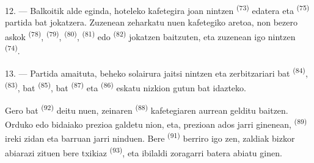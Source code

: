 12. --- Balkoitik alde eginda, hoteleko kafetegira joan nintzen 
\textsuperscript{(73)} edatera eta  \textsuperscript{(75)} partida
bat jokatzera. Zuzenean zeharkatu nuen kafetegiko aretoa, non bezero askok
 \textsuperscript{(78)}, 
\textsuperscript{(79)},  \textsuperscript{(80)},
 \textsuperscript{(81)} edo 
\textsuperscript{(82)} jokatzen baitzuten, eta zuzenean igo nintzen
 \textsuperscript{(74)}.

13. --- Partida amaituta, beheko solairura jaitsi nintzen eta zerbitzariari
 bat \textsuperscript{(84)}, 
\textsuperscript{(83)},  bat \textsuperscript{(85)},
 bat \textsuperscript{(87)} eta 
\textsuperscript{(86)} eskatu nizkion gutun bat idazteko.

Gero  bat \textsuperscript{(92)} deitu nuen, zeinaren
 \textsuperscript{(88)} kafetegiaren aurrean gelditu baitzen.
Orduko edo bidaiako prezioa galdetu nion, eta, prezioan ados jarri ginenean,
 \textsuperscript{(89)} ireki zidan eta barruan jarri ninduen.
Bere  \textsuperscript{(91)} berriro igo zen, zaldiak bizkor
abiarazi zituen bere  txikiaz \textsuperscript{(93)}, eta ibilaldi
zoragarri batera abiatu ginen.
\VUsaut{6.0mm}
\VUfilet{22mm}
